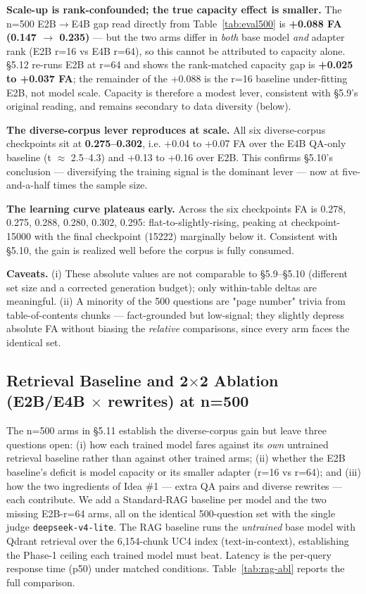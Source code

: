 \documentclass[10pt,twocolumn]{article}
\begin{document}
\textbf{Scale-up is rank-confounded; the true capacity effect is smaller.} The n=500 E2B$\to$E4B gap read directly from Table~\ref{tab:eval500} is \textbf{+0.088 FA (0.147 $\to$ 0.235)} --- but the two arms differ in \textit{both} base model \textit{and} adapter rank (E2B r=16 vs E4B r=64), so this cannot be attributed to capacity alone. \S{}5.12 re-runs E2B at r=64 and shows the rank-matched capacity gap is \textbf{+0.025 to +0.037 FA}; the remainder of the +0.088 is the r=16 baseline under-fitting E2B, not model scale. Capacity is therefore a modest lever, consistent with \S{}5.9's original reading, and remains secondary to data diversity (below).


\textbf{The diverse-corpus lever reproduces at scale.} All six diverse-corpus checkpoints sit at \textbf{0.275--0.302}, i.e. +0.04 to +0.07 FA over the E4B QA-only baseline (t $\approx$ 2.5--4.3) and +0.13 to +0.16 over E2B. This confirms \S{}5.10's conclusion --- diversifying the training signal is the dominant lever --- now at five-and-a-half times the sample size.


\textbf{The learning curve plateaus early.} Across the six checkpoints FA is 0.278, 0.275, 0.288, 0.280, 0.302, 0.295: flat-to-slightly-rising, peaking at checkpoint-15000 with the final checkpoint (15222) marginally below it. Consistent with \S{}5.10, the gain is realized well before the corpus is fully consumed.


\textbf{Caveats.} (i) These absolute values are not comparable to \S{}5.9--\S{}5.10 (different set size and a corrected generation budget); only within-table deltas are meaningful. (ii) A minority of the 500 questions are "page number" trivia from table-of-contents chunks --- fact-grounded but low-signal; they slightly depress absolute FA without biasing the \textit{relative} comparisons, since every arm faces the identical set.


\subsection{Retrieval Baseline and 2$\times$2 Ablation (E2B/E4B $\times$ rewrites) at n=500}

The n=500 arms in \S{}5.11 establish the diverse-corpus gain but leave three questions open: (i) how each trained model fares against its \textit{own} untrained retrieval baseline rather than against other trained arms; (ii) whether the E2B baseline's deficit is model capacity or its smaller adapter (r=16 vs r=64); and (iii) how the two ingredients of Idea \#1 --- extra QA pairs and diverse rewrites --- each contribute. We add a Standard-RAG baseline per model and the two missing E2B-r=64 arms, all on the identical 500-question set with the single judge \texttt{deepseek-v4-lite}. The RAG baseline runs the \textit{untrained} base model with Qdrant retrieval over the 6,154-chunk UC4 index (text-in-context), establishing the Phase-1 ceiling each trained model must beat. Latency is the per-query response time (p50) under matched conditions. Table~\ref{tab:rag-abl} reports the full comparison.
\end{document}
